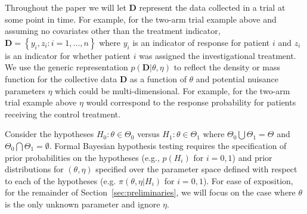 \documentclass[12pt]{article}
\begin{document}
Throughout the paper we will let $\mathbf{D}$ represent the data collected in a trial at some point in time. 
%
For example, for the two-arm trial example above and assuming no covariates other than the treatment indicator, $\mathbf{D}=\left\{y_i,z_i:i=1,...,n\right\}$ where $y_i$ is an 
indicator of response for patient $i$ and $z_i$ is an indicator for whether patient $i$ was assigned the investigational treatment.
%
We use the generic representation $p(\mathbf{D}|\theta,\eta)$ to reflect the density or mass function for the collective data $\mathbf{D}$ as a function of $\theta$ and potential nuisance parameters
$\eta$ which could be multi-dimensional.
%
For example, for the two-arm trial example above $\eta$ would correspond to the response probability for patients receiving the control treatment.


Consider the hypotheses $H_0:\theta\in\Theta_{0}$ versus $H_1:\theta\in\Theta_{1}$ where $\Theta_{0}\bigcup \Theta_{1} = \Theta$ and $\Theta_{0} \bigcap \Theta_{1} = \emptyset$.
%
Formal Bayesian hypothesis testing requires the specification of prior probabilities on the hypotheses (e.g., $p(H_i)$ for $i=0,1$)
and prior distributions for $\left(\theta,\eta\right)$ specified over the parameter space defined with respect to each of the 
hypotheses (e.g. $\pi\left(\theta,\eta \big| H_i\right)$ for $i=0,1$). 
%
For ease of exposition, for the remainder of Section~\ref{sec:preliminaries}, we will focus on the case where $\theta$ is the 
only unknown parameter and ignore $\eta$.
\end{document}
